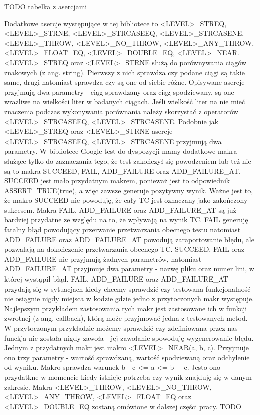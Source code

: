 \documentclass[12pt,a4paper,notitlepage]{report}
\begin{document}
TODO tabelka z asercjami

Dodatkowe asercje występujące w tej bibliotece to <LEVEL>_STREQ, <LEVEL>_STRNE, <LEVEL>_STRCASEEQ, <LEVEL>_STRCASENE, <LEVEL>_THROW, <LEVEL>_NO_THROW, <LEVEL>_ANY_THROW, <LEVEL>_FLOAT_EQ, <LEVEL>_DOUBLE_EQ, <LEVEL>_NEAR.
<LEVEL>_STREQ oraz <LEVEL>_STRNE służą do porównywania ciągów znakowych (z ang. string). Pierwszy z nich sprawdza czy podane ciągi są takie same, drugi natomiast sprawdza czy są one od siebie różne. Opisywane asercje przyjmują dwa parametry - ciąg sprawdzany oraz ciąg spodziewany, są one wrażliwe na wielkości liter w badanych ciągach. Jeśli wielkość liter na nie mieć znaczenia podczas wykonywania porównania należy skorzystać z operatorów 
<LEVEL>_STRCASEEQ, <LEVEL>_STRCASENE. Podobnie jak <LEVEL>_STREQ oraz <LEVEL>_STRNE asercje <LEVEL>_STRCASEEQ, <LEVEL>_STRCASENE przyjmują dwa parametry.
W bibliotece Google test do dyspozycji mamy dodatkowe makra służące tylko do zaznaczania tego, że test zakończył się powodzeniem lub też nie - są to makra SUCCEED, FAIL, ADD_FAILURE oraz ADD_FAILURE_AT.
SUCCEED jest mało przydatnym makrem, ponieważ jest to odpowiednik ASSERT_TRUE(true), a więc zawsze generuje pozytywny wynik. Ważne jest to, że makro SUCCEED nie powoduję, że cały TC jest oznaczany jako zakończony sukcesem.
Makra FAIL, ADD_FAILURE oraz ADD_FAILURE_AT są już bardziej przydatne ze względu na to, że wpływają na wynik TC. FAIL generuję fatalny błąd powodujący przerwanie przetwarzania obecnego testu natomiast ADD_FAILURE oraz ADD_FAILURE_AT powodują zaraportowanie błędu, ale pozwalają na dokończenie przetwarzania obecnego TC.
SUCCEED, FAIL oraz ADD_FAILURE nie przyjmują żadnych parametrów, natomiast ADD_FAILURE_AT przyjmuje dwa parametry - nazwę pliku oraz numer lini, w której wystąpił błąd.
FAIL, ADD_FAILURE oraz ADD_FAILURE_AT przydają się w sytuacjach kiedy chcemy sprawdzić czy testowana funkcjonalność nie osiągnie nigdy miejsca w kodzie gdzie jedno z przytoczonych makr występuje. Najlepszym przykładem zastosowania tych makr jest zastosowane ich w funkcji zwrotnej (z ang. callback), którą może przyjmować jedna z testowanych metod. W przytoczonym przykładzie możemy sprawdzić czy zdefiniowana przez nas funckja nie została nigdy zawoła - jej zawołanie spowoduję wygenerowanie błędu.
Jednym z przydatnych makr jest makro <LEVEL>_NEAR(a, b, c). Przyjmuje ono trzy parametry - wartość sprawdzaną, wartość spodziewaną oraz odchylenie od wyniku. Makro sprawdza warunek b - c <= a <= b + c. Jesto ono przydatkne w momencie kiedy istnieje potrzeba czy wynik znajduję się w danym zakresie.
Makra <LEVEL>_THROW, <LEVEL>_NO_THROW, <LEVEL>_ANY_THROW, <LEVEL>_FLOAT_EQ oraz <LEVEL>_DOUBLE_EQ zostaną omówione w dalszej części pracy. TODO
\end{document}

